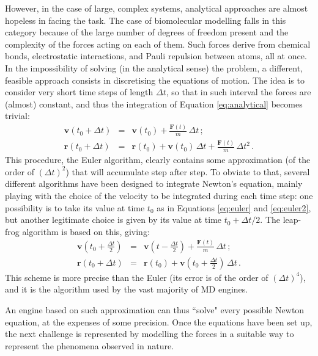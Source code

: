 However, in the case of large, complex systems, analytical approaches are almost hopeless in facing the task. The case of biomolecular modelling falls in this category because of the large number of degrees of freedom present and the complexity of the forces acting on each of them. Such forces derive from chemical bonds, electrostatic interactions, and Pauli repulsion between atoms, all at once. In the impossibility of solving (in the analytical sense) the problem, a different, feasible approach consists in discretising the equations of motion. The idea is to consider very short time steps of length $\Delta t$, so that in such interval the forces are (almost) constant, and thus the integration of Equation \ref{eq:analytical} becomes trivial:
\begin{eqnarray} \label{eq:euler}
\mathbf{v}(t_0 + \Delta t) &=& \mathbf{v}(t_0) + \frac{\mathbf{F}(t)}{m} \, \Delta t \,; \\
\mathbf{r}(t_0 + \Delta t) &=& \mathbf{r}(t_0) + \mathbf{v}(t_0) \, \Delta t + \frac{\mathbf{F}(t)}{m} \, \Delta t^2 \,. \label{eq:euler2}
\end{eqnarray}
This procedure, the Euler algorithm, clearly contains some approximation (of the order of $(\Delta t)^2$) that will accumulate step after step. To obviate to that, several different algorithms have been designed to integrate Newton's equation, mainly playing with the choice of the velocity to be integrated during each time step: one possibility is to take its value at time $t_0$ as in Equations \ref{eq:euler} and \ref{eq:euler2}, but another legitimate choice is given by its value at time $t_0 + \Delta t/2$. The leap-frog algorithm is based on this, giving:
\begin{eqnarray}
\mathbf{v}\left(t_0 + \frac{\Delta t}{2}\right) &=& \mathbf{v}\left(t - \frac{\Delta t}{2}\right) + \frac{\mathbf{F}(t)}{m} \, \Delta t \, ; \\
\mathbf{r}(t_0 + \Delta t) &=& \mathbf{r}(t_0) + \mathbf{v}\left(t_0 + \frac{\Delta t}{2}\right) \, \Delta t \, .
\end{eqnarray}
This scheme is more precise than the Euler (its error is of the order of $(\Delta t)^4$), and it is the algorithm used by the vast majority of MD engines.

An engine based on such approximation can thus ``solve" every possible Newton equation, at the expenses of some precision. Once the equations have been set up, the next challenge is represented by modelling the forces in a suitable way to represent the phenomena observed in nature.


